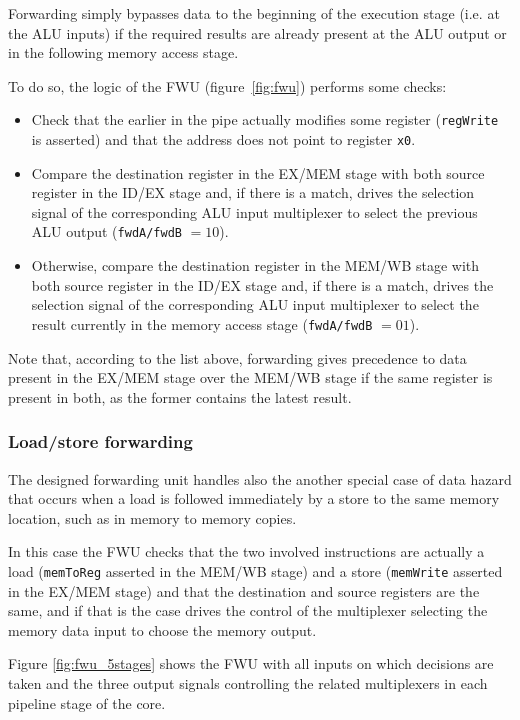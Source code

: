 \documentclass[a4paper]{article}
\begin{document}
Forwarding simply bypasses data to the beginning of the execution stage (i.e. at the ALU inputs) if the required results are already present at the ALU output or in the following memory access stage. 

To do so, the logic of the FWU (figure~\ref{fig:fwu}) performs some checks:
\begin{itemize}
    \item Check that the earlier in the pipe actually modifies some register (\texttt{regWrite} is asserted) and that the address does not point to register \texttt{x0}.
    \item Compare the destination register in the EX/MEM stage with both source register in the ID/EX stage and, if there is a match, drives the selection signal of the corresponding ALU input multiplexer to select the previous ALU output (\texttt{fwdA/fwdB} $= 10$).
    \item Otherwise, compare the destination register in the MEM/WB stage with both source register in the ID/EX stage and, if there is a match, drives the selection signal of the corresponding ALU input multiplexer to select the result currently in the memory access stage (\texttt{fwdA/fwdB} $= 01$).
\end{itemize}

Note that, according to the list above, forwarding gives precedence to data present in the EX/MEM stage over the MEM/WB stage if the same register is present in both, as the former contains the latest result.

\subsubsection{Load/store forwarding}
The designed forwarding unit handles also the another special case of data hazard that occurs when a load is followed immediately by a store to the same memory location, such as in memory to memory copies. 

In this case the FWU checks that the two involved instructions are actually a load (\texttt{memToReg} asserted in the MEM/WB stage) and a store (\texttt{memWrite} asserted in the EX/MEM stage) and that the destination and source registers are the same, and if that is the case drives the control of the multiplexer selecting the memory data input to choose the memory output.

Figure \ref{fig:fwu_5stages} shows the FWU with all inputs on which decisions are taken and the three output signals controlling the related multiplexers in each pipeline stage of the core.
\end{document}
